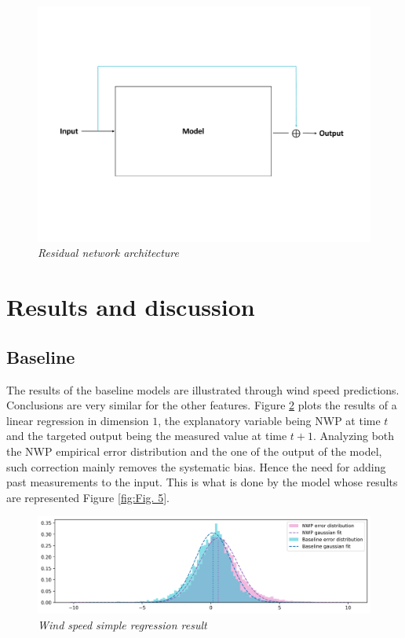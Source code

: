 \documentclass{article}
\begin{document}
\vspace{-30px}

\begin{figure}[H]
    \centering
    \includegraphics[width=.9\linewidth]{img/residual.pdf}
    \vspace{-30px}
    \caption{\textit{Residual network architecture}}
    \label{fig:Fig. 3}
\end{figure}

\section{Results and discussion}
\subsection*{Baseline}

The results of the baseline models are illustrated through wind speed predictions. Conclusions are very similar
for the other features. Figure \ref{fig:Fig. 4} plots the results of a linear regression in dimension $1$, the explanatory
variable being NWP at time $t$ and the targeted output being the measured value at time $t + 1$. Analyzing both
the NWP empirical error distribution and the one of the
output of the model, such correction mainly removes the systematic bias.
Hence the need for adding past measurements to the input. This is what is done by the model whose results
are represented Figure \ref{fig:Fig. 5}.


\begin{figure}[H]
    \centering
    \includegraphics[width=\linewidth]{img/base.png}
    \caption{\textit{Wind speed simple regression result}}
    \label{fig:Fig. 4}
\end{figure}
\end{document}
